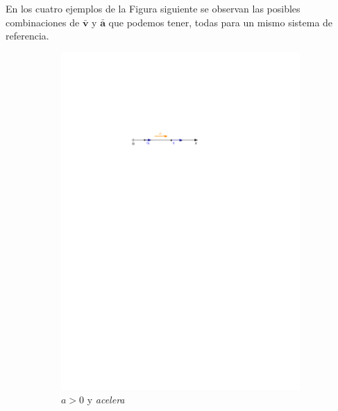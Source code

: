 En los cuatro ejemplos de la Figura siguiente se observan las posibles combinaciones de $\mathbold{\bar{v}}$ y $\mathbold{\bar{a}}$ que podemos tener, todas para un mismo sistema de referencia.

\begin{figure}[H]
 \begin{subfigure}{0.5\textwidth}
    \centering
 	\includegraphics[width=.9\linewidth]{img/acelera1.pdf}
	\caption{$a>0$ y  \textit{acelera}}	
\end{subfigure}   
 \begin{subfigure}{0.5\textwidth}
    \centering

\end{subfigure}
\end{figure}
